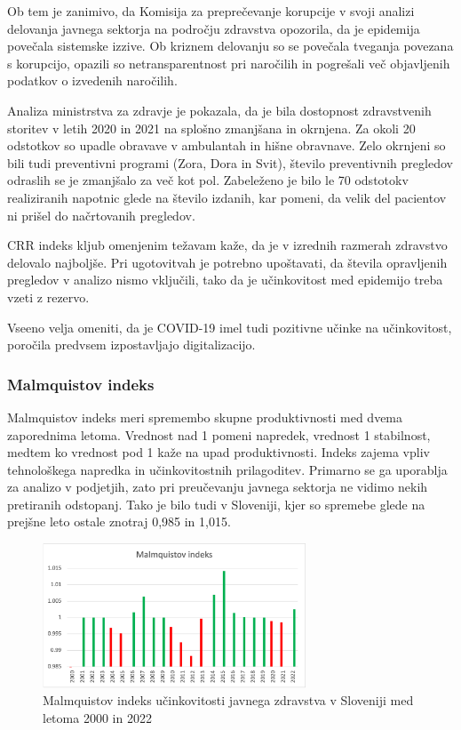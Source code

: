 \documentclass[12pt,a4paper]{article}
\theoremstyle{definition}
\begin{document}
Ob tem je zanimivo, da Komisija za preprečevanje korupcije v svoji analizi delovanja javnega sektorja na področju zdravstva opozorila, da je epidemija povečala sistemske izzive. 
Ob kriznem delovanju so se povečala tveganja povezana s korupcijo, opazili so netransparentnost pri naročilih in pogrešali več objavljenih podatkov o izvedenih naročilih. 
\cite{analizaJavnegaZdravstva2023} 

Analiza ministrstva za zdravje je pokazala, da je bila dostopnost zdravstvenih storitev v letih 2020 in 2021 na splošno zmanjšana in okrnjena. 
Za okoli 20 odstotkov so upadle obravave v ambulantah in hišne obravnave. Zelo okrnjeni so bili tudi preventivni programi (Zora, Dora in Svit), število preventivnih pregledov odraslih se je zmanjšalo za več kot pol. 
Zabeleženo je bilo le 70 odstotokv realiziranih napotnic glede na število izdanih, kar pomeni, da velik del pacientov ni prišel do načrtovanih pregledov. \cite{jamsek2022analiza}

CRR indeks kljub omenjenim težavam kaže, da je v izrednih razmerah zdravstvo delovalo najboljše. Pri ugotovitvah je potrebno upoštavati, da števila opravljenih pregledov v analizo nismo vključili, tako da je učinkovitost med epidemijo treba vzeti z rezervo.

Vseeno velja omeniti, da je COVID-19 imel tudi pozitivne učinke na učinkovitost, poročila predvsem izpostavljajo digitalizacijo.


\subsubsection{Malmquistov indeks}
Malmquistov indeks meri spremembo skupne produktivnosti med dvema zaporednima letoma. 
Vrednost nad 1 pomeni napredek, vrednost 1 stabilnost, medtem ko vrednost pod 1 kaže na upad produktivnosti. 
Indeks zajema vpliv tehnološkega napredka in učinkovitostnih prilagoditev. Primarno se ga uporablja za analizo v podjetjih, 
zato pri preučevanju javnega sektorja ne vidimo nekih pretiranih odstopanj. 
Tako je bilo tudi v Sloveniji, kjer so spremebe glede na prejšne leto ostale znotraj 0,985 in 1,015.

\begin{figure}[H]
    \centering
    \includegraphics[width=0.7\textwidth]{malmq_ind_slo.png}
    \caption{Malmquistov indeks učinkovitosti javnega zdravstva v Sloveniji med letoma 2000 in 2022}
    \label{fig:malmq_ind_slo.png}
\end{figure}
\end{document}
